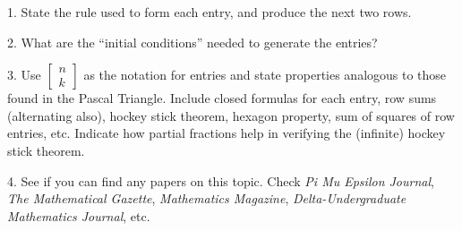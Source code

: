 \documentclass[10pt,]{book}
\theoremstyle{plain}
\theoremstyle{definition}
\theoremstyle{definition}
\numberwithin{equation}{chapter}
\begin{document}
\begin{exerciselist}
\item[1.]\hypertarget{exercise-110}{}\hypertarget{p-250}{}%
State the rule used to form each entry, and produce the next two rows.%
\par\smallskip
\item[2.]\hypertarget{exercise-111}{}\hypertarget{p-251}{}%
What are the ``initial conditions'' needed to generate the entries?%
\par\smallskip
\item[3.]\hypertarget{exercise-112}{}\hypertarget{p-252}{}%
Use \(\begin{bmatrix} n\\ k \end{bmatrix}\) as the notation for entries and state properties analogous to those found in the Pascal Triangle. Include closed formulas for each entry, row sums (alternating also), hockey stick theorem, hexagon property, sum of squares of row entries, etc. Indicate how partial fractions help in verifying the (infinite) hockey stick theorem.%
\par\smallskip
\item[4.]\hypertarget{exercise-113}{}\hypertarget{p-253}{}%
See if you can find any papers on this topic. Check \emph{Pi Mu Epsilon Journal}, \emph{The Mathematical Gazette}, \emph{Mathematics Magazine}, \emph{Delta-Undergraduate Mathematics Journal}, etc.%
\par\smallskip
\end{exerciselist}
\typeout{************************************************}
\typeout{************************************************}
\end{document}
